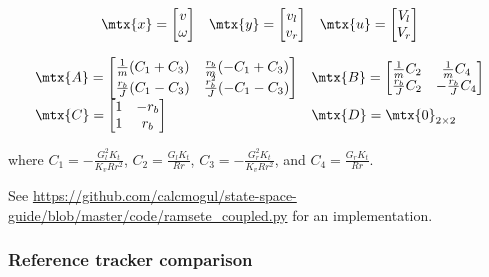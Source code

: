 \begin{theorem}
  \label{thm:ramsete_coupled_ref_tracker}
  \begin{equation*}
    \begin{array}{ccc}
      \mtx{x} =
      \begin{bmatrix}
        v \\
        \omega
      \end{bmatrix} &
      \mtx{y} =
      \begin{bmatrix}
        v_l \\
        v_r
      \end{bmatrix} &
      \mtx{u} =
      \begin{bmatrix}
        V_l \\
        V_r
      \end{bmatrix}
    \end{array}
  \end{equation*}

  \begin{equation}
    \begin{array}{ll}
      \mtx{A} =
      \begin{bmatrix}
        \frac{1}{m}(C_1 + C_3) & \frac{r_b}{m}(-C_1 + C_3) \\
        \frac{r_b}{J}(C_1 - C_3) & \frac{r_b^2}{J}(-C_1 - C_3)
      \end{bmatrix} &
      \mtx{B} =
      \begin{bmatrix}
        \frac{1}{m}C_2 & \frac{1}{m}C_4 \\
        \frac{r_b}{J}C_2 & -\frac{r_b}{J}C_4
      \end{bmatrix} \\
      \mtx{C} =
      \begin{bmatrix}
        1 & -r_b \\
        1 & r_b
      \end{bmatrix} &
      \mtx{D} = \mtx{0}_{2 \times 2}
    \end{array}
  \end{equation}

  where $C_1 = -\frac{G_l^2 K_t}{K_v R r^2}$, $C_2 = \frac{G_l K_t}{Rr}$,
  $C_3 = -\frac{G_r^2 K_t}{K_v R r^2}$, and $C_4 = \frac{G_r K_t}{Rr}$.
\end{theorem}

See
\url{https://github.com/calcmogul/state-space-guide/blob/master/code/ramsete_coupled.py}
for an implementation.

\subsubsection{Reference tracker comparison}


